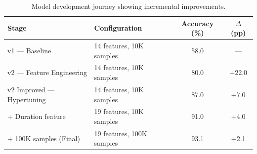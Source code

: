 \begin{table}[htbp]
\centering
\caption{Model development journey showing incremental improvements.}
\label{tab:improvement}
\begin{tabular}{llcc}
\toprule
Stage & Configuration & Accuracy (\%) & $\Delta$ (pp) \\
\midrule
v1 — Baseline & 14 features, 10K samples & 58.0 & — \\
v2 — Feature Engineering & 14 features, 10K samples & 80.0 & +22.0 \\
v2 Improved — Hypertuning & 14 features, 10K samples & 87.0 & +7.0 \\
+ Duration feature & 19 features, 10K samples & 91.0 & +4.0 \\
+ 100K samples (Final) & 19 features, 100K samples & 93.1 & +2.1 \\
\bottomrule
\end{tabular}
\end{table}